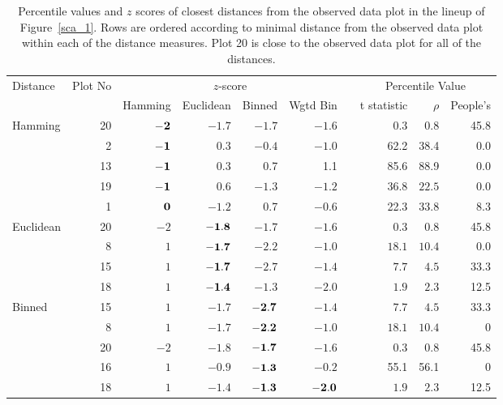 \begin{table}[hbt]
	\vspace{-.1in}
\caption{Percentile values and $z$ scores of closest distances from the observed data plot in the lineup of Figure~\ref{sca_1}. Rows are ordered according to minimal distance from the observed data plot within each of the distance measures. Plot 20 is close to the observed data plot for all  of the distances.}
%
\centering  %
\begin{tabular}{l r rrrr r rrr}  %
\hline                       %
Distance & Plot No &\multicolumn{4}{c}{$z$-score} & &\multicolumn{3}{c}{Percentile Value} \\ [0.5ex]   
 \cline{1-1}\cline{3-6}\cline{8-10}
 & & Hamming & Euclidean & Binned & Wgtd Bin & & t statistic & $\rho$ & People's   \\     [0.5ex]
\hline
Hamming  & 20 & $\bf -2$ & $-1.7$ & $-1.7$ & $-1.6$ & & 0.3 & 0.8 & 45.8 \\[-0.5ex]
 & 2 & $\bf -1$ & 0.3 & $-0.4$ & $-1.0$ & & 62.2 & 38.4 & 0.0\\[-0.5ex]
 & 13 & $\bf  -1$ & 0.3 & 0.7 & 1.1 & & 85.6 & 88.9 & 0.0 \\[-0.5ex]
& 19 & $\bf -1$ & $0.6$ & $-1.3$ & $-1.2$ &  & $36.8$ & $22.5$ & 0.0 \\[-0.5ex]
 & 1 & $\bf 0$ & $-1.2$ & 0.7 & $-0.6$ & & 22.3 & 33.8 & 8.3 \\[1ex]

Euclidean  & 20 & $-2$ & $\bf -1.8$ & $-1.7$ & $-1.6$ & & $0.3$ & $0.8$  & 45.8 \\[-0.5ex]
		 & 8 & $ 1$ & $\bf -1.7$ & $-2.2$ & $-1.0$ & & $18.1$ & $10.4$ & 0.0 \\[-0.5ex]
 		& 15 & $1$ & $\bf -1.7$ & $-2.7$ & $ -1.4$ & & $7.7$ & $4.5$ & 33.3\\[-0.5ex]
 		& 18 & $1$ & $\bf -1.4$ & $-1.3$ & $ -2.0$ & & $1.9$ & $2.3$ & 12.5\\[1ex]

Binned  & 15 & $1$ & $-1.7$ & $\bf -2.7$ & $ -1.4$ & & $7.7$ & $4.5$ & 33.3\\[-0.5ex]
	    & 8 & $ 1$ & $-1.7$ & $\bf -2.2$ & $-1.0$ & & $18.1$ & $10.4$ & 0 \\[-0.5ex]
	   & 20 & $-2$ & $-1.8$ & $\bf -1.7$ & $ -1.6$ & & $0.3$ & $0.8$ & 45.8 \\[-0.5ex]
 		& 16  & $1$ & $-0.9$ & $\bf -1.3$ & $-0.2$ & & 55.1 & 56.1 & 0\\[-0.5ex]
		& 18 & $1$ & $-1.4$ & $\bf -1.3$ & $\bf -2.0$ & & $1.9$ & $2.3$ & 12.5\\[1ex]


\end{tabular}
\end{table}

